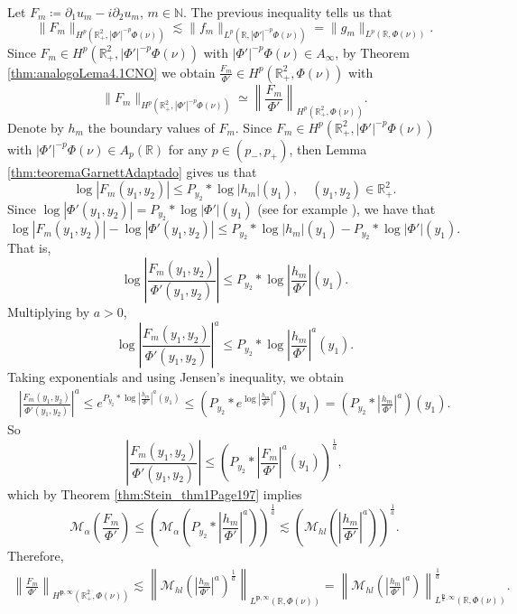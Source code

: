 \documentclass[12pt]{amsart}
\newcommand{\R}{\mathbb{R}}
\newcommand{\N}{\mathbb{N}}
\theoremstyle{plain}
\theoremstyle{definition}
\numberwithin{equation}{section}
\begin{document}
Let $F_m\coloneqq \partial_{1}u_m-i\partial_2 u_m$, $m\in\N$. The previous inequality tells us that
\[
\|F_m\|_{H^p(\R_{+}^{2},|\Phi'|^{-p}\Phi(\nu))}
\lesssim 
\|f_m\|_{L^p(\R,|\Phi'|^{-p}\Phi(\nu))}
=
\|g_m\|_{L^p(\R,\Phi(\nu))}.
\]
Since $F_m\in H^p(\R_{+}^{2},|\Phi'|^{-p}\Phi(\nu))$ with $|\Phi'|^{-p}\Phi(\nu)\in A_{\infty}$, by Theorem \ref{thm:analogoLema4.1CNO} we obtain $\frac{F_m}{\Phi'}\in H^p(\R_{+}^{2},\Phi(\nu))$ with
\[
\|F_m\|_{H^p(\R_{+}^{2},|\Phi'|^{-p}\Phi(\nu))}
\simeq 
\left\|
\frac{F_m}{\Phi'}
\right\|_{H^p(\R_{+}^{2},\Phi(\nu))}.
\]
Denote by $h_m$ the boundary values of $F_m$. Since $F_m\in H^p(\R_{+}^{2},|\Phi'|^{-p}\Phi(\nu))$ with $|\Phi'|^{-p}\Phi(\nu)\in A_p(\R)$ for any $p\in (p_{-},p_{+})$, then Lemma \ref{thm:teoremaGarnettAdaptado} gives us that
\[
\log{|F_m(y_1,y_2)|}
\leq 
P_{y_2}\ast \log|h_m|(y_1),\quad (y_1,y_2)\in \R_{+}^{2}.
\]
Since $\log{|\Phi'(y_1,y_2)|}=P_{y_2}\ast \log{|\Phi'|}(y_1)$ (see for example \cite{AE_FBY}), we have that
\[
\log{|F_m(y_1,y_2)|}-\log{|\Phi'(y_1,y_2)|}
\leq 
P_{y_2}\ast \log{|h_m|}(y_1)-P_{y_{2}}\ast \log{|\Phi'|}(y_1).
\]
That is,
\[
\log{\left|\frac{F_m(y_1,y_2)}{\Phi'(y_1,y_2)}\right|}
\leq 
P_{y_2}\ast \log{\left|\frac{h_m}{\Phi'}\right|}(y_1).
\]
Multiplying by $a>0$, 
\[
\log{\left|\frac{F_m(y_1,y_2)}{\Phi'(y_1,y_2)}\right|^{a}}
\leq 
P_{y_2}\ast \log{\left|\frac{h_m}{\Phi'}\right|^{a}}(y_1).
\]
Taking exponentials and using Jensen's inequality, we obtain
\begin{align*}
    \left|\frac{F_m(y_1,y_2)}{\Phi'(y_1,y_2)}\right|^{a}
    \leq 
    e^{P_{y_2}\ast \log{|\frac{h_m}{\Phi'}|^{a}}(y_1)}
    \leq 
    (P_{y_2}\ast e^{\log{|\frac{h_m}{\Phi'}|^{a}}})(y_1)
    =
    \left(P_{y_2}\ast \left|\frac{h_m}{\Phi'}\right|^{a}\right)(y_1).
\end{align*}
So
\[
\left|
\frac{F_m(y_1,y_2)}{\Phi'(y_1,y_2)}
\right|
\leq 
\left(P_{y_2}\ast \left|\frac{F_m}{\Phi'}\right|^{a}(y_1)\right)^{\frac{1}{a}},
\]
which by Theorem \ref{thm:Stein_thm1Page197} implies 
\[
\mathcal{M}_{\alpha}\left(\frac{F_m}{\Phi'}\right)
\leq 
\left(\mathcal{M}_{\alpha}\left(P_{y_2}\ast \left|\frac{h_m}{\Phi'}\right|^{a}\right)\right)^{\frac{1}{a}}
\lesssim 
\left(\mathcal{M}_{hl}\left(\left|\frac{h_m}{\Phi'}\right|^{a}\right)\right)^{\frac{1}{a}}.
\]
Therefore,
\begin{align*}
    \left\|\frac{F_m}{\Phi'}\right\|_{H^{\bm{p},\infty}(\R_{+}^{2},\Phi(\nu))}
    \lesssim 
    \left\|
    \mathcal{M}_{hl}\left(\left|\frac{h_m}{\Phi'}\right|^{a}\right)^{\frac{1}{a}}
    \right\|_{L^{\bm{p},\infty}(\R,\Phi(\nu))}
    =
    \left\|\mathcal{M}_{hl}\left(\left|\frac{h_m}{\Phi'}\right|^{a}\right)\right\|_{L^{\frac{\bm{p}}{a},\infty}(\R,\Phi(\nu))}^{\frac{1}{a}}.
\end{align*}
\end{document}
